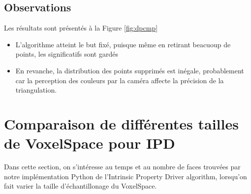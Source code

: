 \documentclass[a4paper,10pt]{report}
\begin{document}
\subsection{Observations}
Les résultats sont présentés à la Figure \ref{fig:dpcmp}
\begin{itemize}
  \item L'algorithme atteint le but fixé, puisque même en retirant beacuoup de points, les significatifs sont gardés
  \item En revanche, la distribution des points supprimés est inégale, probablement car la perception des couleurs par la caméra affecte la précision de la triangulation.
\end{itemize}

\section{Comparaison de différentes tailles de VoxelSpace pour IPD}
Dans cette section, on s'intéresse au temps et au nombre de faces trouvées par notre implémentation Python de l'Intrinsic Property Driver algorithm, lorsqu'on fait varier la taille d'échantillonage du VoxelSpace.
\end{document}
